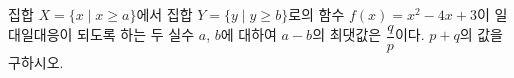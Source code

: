 집합 $X=\{x \mid x\ge a\}$에서 집합 $Y=\{y \mid y\ge b\}$로의 함수 $f(x)=x^2-4x+3$이 일대일대응이 되도록 하는 두 실수 $a$, $b$에 대하여 $a-b$의 최댓값은 $\dfrac{q}{p}$이다. $p+q$의 값을 구하시오. 
